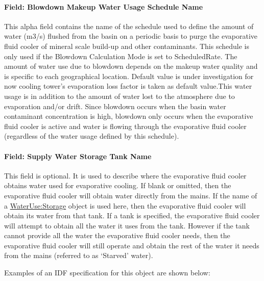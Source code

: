 \paragraph{Field: Blowdown Makeup Water Usage Schedule Name}\label{field-blowdown-makeup-water-usage-schedule-name-5}

This alpha field contains the name of the schedule used to define the amount of water (m3/s) flushed from the basin on a periodic basis to purge the evaporative fluid cooler of mineral scale build-up and other contaminants. This schedule is only used if the Blowdown Calculation Mode is set to ScheduledRate. The amount of water use due to blowdown depends on the makeup water quality and is specific to each geographical location. Default value is under investigation for now cooling tower's evaporation loss factor is taken as default value.This water usage is in addition to the amount of water lost to the atmosphere due to evaporation and/or drift. Since blowdown occurs when the basin water contaminant concentration is high, blowdown only occurs when the evaporative fluid cooler is active and water is flowing through the evaporative fluid cooler (regardless of the water usage defined by this schedule).

\paragraph{Field: Supply Water Storage Tank Name}\label{field-supply-water-storage-tank-name-5}

This field is optional. It is used to describe where the evaporative fluid cooler obtains water used for evaporative cooling. If blank or omitted, then the evaporative fluid cooler will obtain water directly from the mains. If the name of a \hyperref[waterusestorage]{WaterUse:Storage} object is used here, then the evaporative fluid cooler will obtain its water from that tank. If a tank is specified, the evaporative fluid cooler will attempt to obtain all the water it uses from the tank. However if the tank cannot provide all the water the evaporative fluid cooler needs, then the evaporative fluid cooler will still operate and obtain the rest of the water it needs from the mains (referred to as `Starved' water).

Examples of an IDF specification for this object are shown below:


